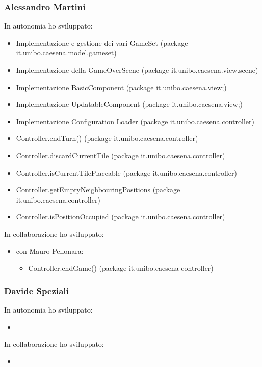 \subsubsection*{Alessandro Martini}
In autonomia ho sviluppato:
\begin{itemize}
    \item Implementazione e gestione dei vari GameSet (package it.unibo.caesena.model.gameset)
    \item Implementazione della GameOverScene (package it.unibo.caesena.view.scene)
    \item Implementazione BasicComponent (package it.unibo.caesena.view;)
    \item Implementazione UpdatableComponent (package it.unibo.caesena.view;)
    \item Implementazione Configuration Loader (package it.unibo.caesena.controller)
    \item Controller.endTurn() (package it.unibo.caesena.controller)
    \item Controller.discardCurrentTile (package it.unibo.caesena.controller)
    \item Controller.isCurrentTilePlaceable (package it.unibo.caesena.controller)
    \item Controller.getEmptyNeighbouringPositions (package it.unibo.caesena.controller)
    \item Controller.isPositionOccupied (package it.unibo.caesena.controller)
\end{itemize}
In collaborazione ho sviluppato:
\begin{itemize}
    \item con Mauro Pellonara:
    \begin{itemize}
        \item Controller.endGame() (package it.unibo.caesena controller)
    \end{itemize}
\end{itemize}

\subsubsection*{Davide Speziali}
In autonomia ho sviluppato:
\begin{itemize}
    \item
\end{itemize}
In collaborazione ho sviluppato:
\begin{itemize}
    \item
\end{itemize}

